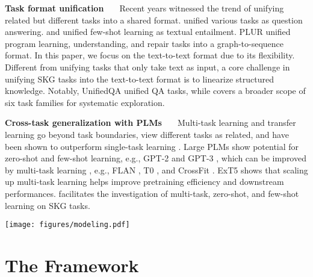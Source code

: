 \documentclass[11pt]{article}
\newcommand{\skg}{SKG\xspace}
\begin{document}
\noindent\textbf{Task format unification \ \ }
Recent years witnessed the trend of unifying related but different tasks into a shared format.
\citet{abs-1806-08730} unified various tasks as question answering. \citet{YinRRSX20} and \citet{abs-2104-14690} unified few-shot learning as textual entailment. PLUR \cite{chen2021plur} unified program learning, understanding, and repair tasks into a graph-to-sequence format. In this paper, we focus on the text-to-text format \cite{2020t5} due to its flexibility. 
Different from unifying tasks that only take text as input, a core challenge in unifying \skg tasks into the text-to-text format is to linearize structured knowledge.
Notably, UnifiedQA \cite{2020unifiedqa} unified QA tasks, while \uskg covers a broader scope of six task families for systematic exploration. 

\noindent\textbf{Cross-task generalization with PLMs \ \ } 
Multi-task learning and transfer learning go beyond task boundaries, view different tasks as related, and have been shown to outperform single-task learning \cite{muppet,vu2021spot}.
Large PLMs show potential for zero-shot and few-shot learning, e.g., GPT-2 \cite{radford2019language} and GPT-3 \cite{brown2020language}, which can be improved by multi-task learning \cite{Zhong2021AdaptingLM}, e.g., FLAN \cite{Jason2021}, T0 \cite{sanh2021multitask}, and CrossFit \cite{Ye2021CrossFitAF}. ExT5 \cite{aribandi2021ext5} shows that scaling up multi-task learning helps improve pretraining efficiency and downstream performances.
\uskg facilitates the investigation of multi-task, zero-shot, and few-shot learning on \skg tasks. 

 
\begin{figure*}[t]
    \centering
    \texttt{[image: figures/modeling.pdf]}
    \caption{We unify SKG tasks with heterogeneous inputs and outputs into the text-to-text format. }
\label{fig:input-output-format}
\end{figure*}

\section{The \uskg Framework}
\label{sec:method}
\end{document}
